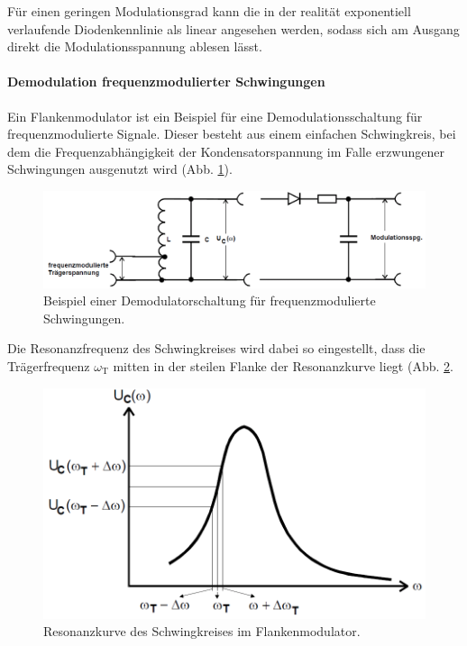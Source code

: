 Für einen geringen Modulationsgrad kann die in der realität exponentiell verlaufende Diodenkennlinie als linear angesehen werden, sodass sich am Ausgang direkt die Modulationsspannung ablesen lässt.

\paragraph{Demodulation frequenzmodulierter Schwingungen}
Ein Flankenmodulator ist ein Beispiel für eine Demodulationsschaltung für frequenzmodulierte Signale.
Dieser besteht aus einem einfachen Schwingkreis, bei dem die Frequenzabhängigkeit der Kondensatorspannung im Falle erzwungener Schwingungen ausgenutzt wird (Abb. \ref{fdm:schaltung}).

\begin{figure}[!h]
    \centering
    \includegraphics[width = 14cm]{images/fdm_schaltung.png}
    \caption{Beispiel einer Demodulatorschaltung für frequenzmodulierte Schwingungen.}
    \label{fdm:schaltung}
\end{figure}

Die Resonanzfrequenz des Schwingkreises wird dabei so eingestellt, dass die Trägerfrequenz $\omega_\text{T}$ mitten in der steilen Flanke der Resonanzkurve liegt (Abb. \ref{fdm:resonanz}.

\begin{figure}[!h]
    \centering
    \includegraphics[width = 14cm]{images/fdm_resonanz.png}
    \caption{Resonanzkurve des Schwingkreises im Flankenmodulator.}
    \label{fdm:resonanz}
\end{figure}

